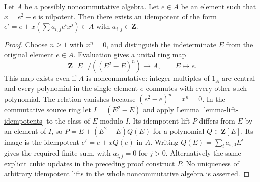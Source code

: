 \begin{lemma}
\label{lemma-lift-idempotents-noncommutative}
Let $A$ be a possibly noncommutative algebra.
Let $e \in A$ be an element such that $x = e^2 - e$ is nilpotent.
Then there exists an idempotent of the form
$e' = e + x(\sum a_{i, j}e^ix^j) \in A$
with $a_{i, j} \in \mathbf{Z}$.
\end{lemma}

\begin{proof}
Choose $n\geq1$ with $x^n=0$, and distinguish the indeterminate
$E$ from the original element $e\in A$. Evaluation gives a unital
ring map
$$
\mathbf Z[E]/((E^2-E)^n)\longrightarrow A,\qquad E\longmapsto e.
$$
This map exists even if $A$ is noncommutative: integer multiples of
$1_A$ are central and every polynomial in the single element $e$
commutes with every other such polynomial. The relation vanishes
because $(e^2-e)^n=x^n=0$.
In the commutative source ring let $I=(E^2-E)$ and apply
Lemma \ref{lemma-lift-idempotents} to the class of $E$ modulo $I$.
Its idempotent lift $P$ differs from $E$ by an element of $I$,
so $P=E+(E^2-E)Q(E)$ for a polynomial $Q\in\mathbf Z[E]$.
Its image is the idempotent $e'=e+xQ(e)$ in $A$.
Writing $Q(E)=\sum_i a_{i,0}E^i$ gives the required finite sum,
with $a_{i,j}=0$ for $j>0$. Alternatively the same explicit cubic
updates in the preceding proof construct $P$. No uniqueness of
arbitrary idempotent lifts in the whole noncommutative algebra is asserted.
\end{proof}